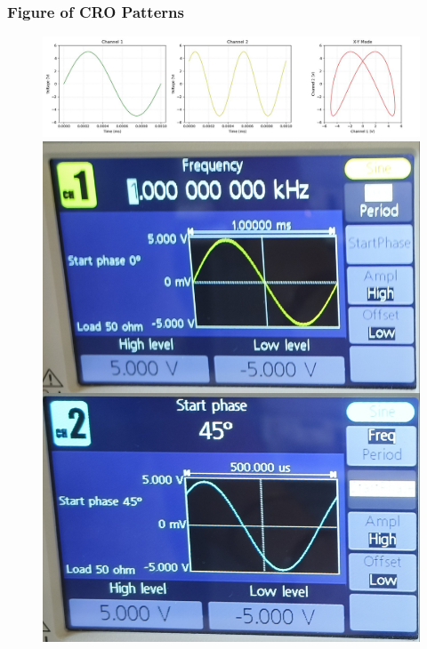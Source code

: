 \documentclass[12pt,a4paper]{report}
\begin{document}
\subsubsection*{Figure of CRO Patterns}
\begin{figure}[H] %
    \centering
    \includegraphics[width=\textwidth]{figs/5.jpg} %
    \begin{minipage}[c]{0.48\textwidth}
        \includegraphics[width=\textwidth]{figs/5read.jpg} %
        

\end{minipage}
\end{figure}
\end{document}
